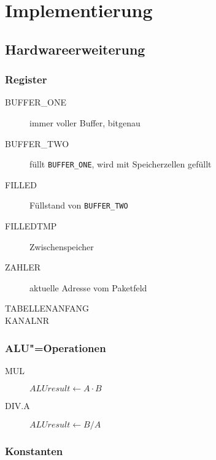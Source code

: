 \chapter{Implementierung}
\label{chapter:Dokumentation-Implementierung}

\section{Hardwareerweiterung}
\label{section:Dokumentation-Implementierung-Hardwareerweiterung}

\subsection{Register}
\label{subsection:Dokumentation-Implementierung-Hardwareerweiterung-Register}

\begin{description}
    \item[BUFFER\_ONE] immer voller Buffer, bitgenau
    \item[BUFFER\_TWO] füllt \texttt{BUFFER\_ONE}, wird mit Speicherzellen gefüllt
    \item[FILLED] Füllstand von \texttt{BUFFER\_TWO}
    \item[FILLEDTMP] Zwischenspeicher
    \item[ZAHLER] aktuelle Adresse vom Paketfeld
    \item[TABELLENANFANG]
    \item[KANALNR]
\end{description}

\subsection{ALU"=Operationen}
\label{subsection:Dokumentation-Implementierung-Hardwareerweiterung-AluOps}


\begin{description}
    \item[MUL] $ALUresult \gets A \cdot B$
    \item[DIV.A] $ALUresult \gets B / A$
\end{description}

\subsection{Konstanten}
\label{subsection:Dokumentation-Implementierung-Hardwareerweiterung-Konstanten}

